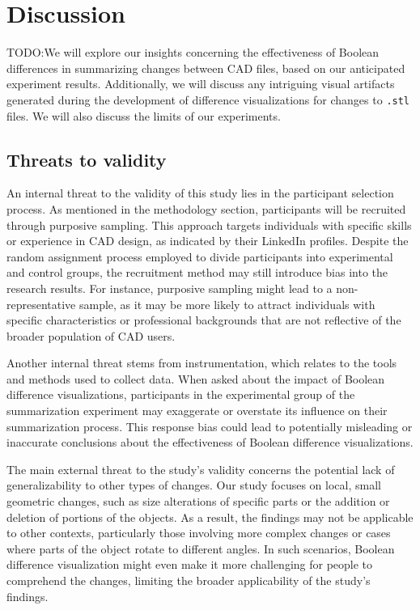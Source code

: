 \documentclass[sigconf,authorversion,nonacm]{acmart}
\begin{document}
\section{Discussion}

TODO:We will explore our insights concerning the effectiveness of Boolean differences in summarizing changes between CAD files, based on our anticipated experiment results. Additionally, we will discuss any intriguing visual artifacts generated during the development of difference visualizations for changes to \texttt{.stl} files. We will also discuss the limits of our experiments.
\subsection{Threats to validity}
An internal threat to the validity of this study lies in the participant selection process. As mentioned in the methodology section, participants will be recruited through purposive sampling.
This approach targets individuals with specific skills or experience in CAD design, as indicated by their LinkedIn profiles. Despite the random assignment process employed to divide participants into experimental and control groups, the recruitment method may still introduce bias into the research results.
For instance, purposive sampling might lead to a non-representative sample, as it may be more likely to attract individuals with specific characteristics or professional backgrounds that are not reflective of the broader population of CAD users.

Another internal threat stems from instrumentation, which relates to the tools and methods used to collect data. When asked about the impact of Boolean difference visualizations, participants in the experimental group of the summarization experiment may exaggerate or overstate its influence on their summarization process.
This response bias could lead to potentially misleading or inaccurate conclusions about the effectiveness of Boolean difference visualizations.

The main external threat to the study's validity concerns the potential lack of generalizability to other types of changes. Our study focuses on local, small geometric changes, such as size alterations of specific parts or the addition or deletion of portions of the objects.
As a result, the findings may not be applicable to other contexts, particularly those involving more complex changes or cases where parts of the object rotate to different angles.
In such scenarios, Boolean difference visualization might even make it more challenging for people to comprehend the changes, limiting the broader applicability of the study's findings.
\end{document}

